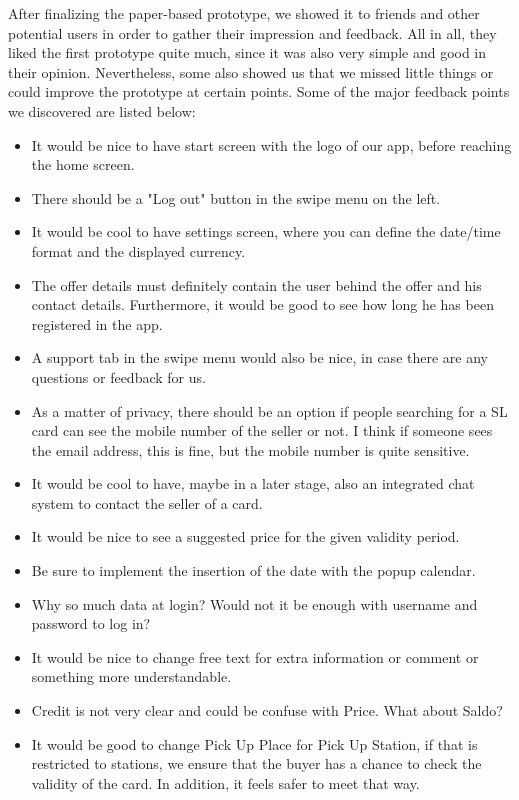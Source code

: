 \documentclass[11pt,twoside,a4paper]{report}
\begin{document}
After finalizing the paper-based prototype, we showed it to friends and other potential users in order to gather their impression and feedback. All in all, they liked the first prototype quite much, since it was also very simple and good in their opinion. Nevertheless, some also showed us that we missed little things or could improve the prototype at certain points. Some of the major feedback points we discovered are listed below:

\begin{itemize}
\item It would be nice to have start screen with the logo of our app, before reaching the home screen.
\item There should be a "Log out" button in the swipe menu on the left.
\item It would be cool to have settings screen, where you can define the date/time format and the displayed currency.
\item The offer details must definitely contain the user behind the offer and his contact details. Furthermore, it would be good to see how long he has been registered in the app.
\item A support tab in the swipe menu would also be nice, in case there are any questions or feedback for us.
\item As a matter of privacy, there should be an option if people searching for a SL card can see the mobile number of the seller or not. I think if someone sees the email address, this is fine, but the mobile number is quite sensitive.
\item It would be cool to have, maybe in a later stage, also an integrated chat system to contact the seller of a card.
\item It would be nice to see a suggested price for the given validity period.
\item Be sure to implement the insertion of the date with the popup calendar.
\item Why so much data at login? Would not it be enough with username and password to log in?
\item It would be nice to change free text for extra information or comment or something more understandable.
\item Credit is not very clear and could be confuse with Price. What about Saldo?
\item It would be good to change Pick Up Place for Pick Up Station, if that is restricted to stations, we ensure that the buyer has a chance to check the validity of the card. In addition, it feels safer to meet that way.
\end{itemize}
\end{document}
